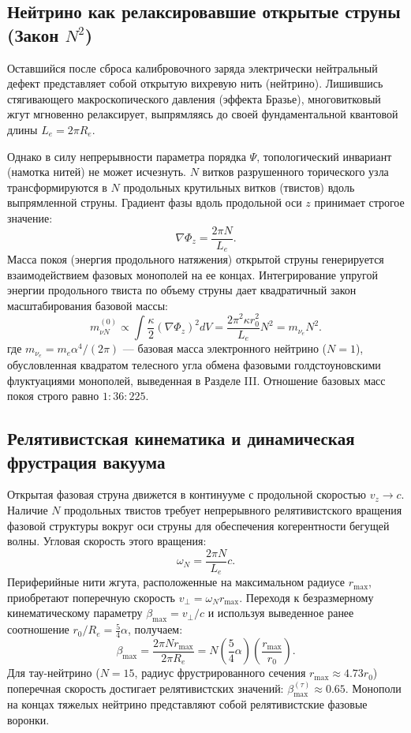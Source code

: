 \documentclass[12pt,a4paper]{article}
\begin{document}
\subsection{Нейтрино как релаксировавшие открытые струны (Закон $N^2$)}
Оставшийся после сброса калибровочного заряда электрически нейтральный дефект представляет собой открытую вихревую нить (нейтрино). Лишившись стягивающего макроскопического давления (эффекта Бразье), многовитковый жгут мгновенно релаксирует, выпрямляясь до своей фундаментальной квантовой длины $L_e = 2\pi R_e$.

Однако в силу непрерывности параметра порядка $\Psi$, топологический инвариант (намотка нитей) не может исчезнуть. $N$ витков разрушенного торического узла трансформируются в $N$ продольных крутильных витков (твистов) вдоль выпрямленной струны. Градиент фазы вдоль продольной оси $z$ принимает строгое значение:
\begin{equation}
	\nabla \Phi_z = \frac{2\pi N}{L_e}.
\end{equation}
Масса покоя (энергия продольного натяжения) открытой струны генерируется взаимодействием фазовых монополей на ее концах. Интегрирование упругой энергии продольного твиста по объему струны дает квадратичный закон масштабирования базовой массы:
\begin{equation}
	m_{\nu N}^{(0)} \propto \int \frac{\kappa}{2} (\nabla \Phi_z)^2 dV = \frac{2\pi^2 \kappa r_0^2}{L_e} N^2 = m_{\nu_e} N^2.
\end{equation}
где $m_{\nu_e} = m_e \alpha^4 / (2\pi)$ — базовая масса электронного нейтрино ($N=1$), обусловленная квадратом телесного угла обмена фазовыми голдстоуновскими флуктуациями монополей, выведенная в Разделе III. Отношение базовых масс покоя строго равно $1 : 36 : 225$.

\subsection{Релятивистская кинематика и динамическая фрустрация вакуума}
Открытая фазовая струна движется в континууме с продольной скоростью $v_z \to c$. Наличие $N$ продольных твистов требует непрерывного релятивистского вращения фазовой структуры вокруг оси струны для обеспечения когерентности бегущей волны. Угловая скорость этого вращения:
\begin{equation}
	\omega_N = \frac{2\pi N}{L_e} c.
\end{equation}
Периферийные нити жгута, расположенные на максимальном радиусе $r_{\text{max}}$, приобретают поперечную скорость $v_\perp = \omega_N r_{\text{max}}$. Переходя к безразмерному кинематическому параметру $\beta_{\text{max}} = v_\perp / c$ и используя выведенное ранее соотношение $r_0/R_e = \frac{5}{4}\alpha$, получаем:
\begin{equation}
	\beta_{\text{max}} = \frac{2\pi N r_{\text{max}}}{2\pi R_e} = N \left( \frac{5}{4}\alpha \right) \left( \frac{r_{\text{max}}}{r_0} \right).
\end{equation}
Для тау-нейтрино ($N=15$, радиус фрустрированного сечения $r_{\text{max}} \approx 4.73 r_0$) поперечная скорость достигает релятивистских значений: $\beta_{\text{max}}^{(\tau)} \approx 0.65$. Монополи на концах тяжелых нейтрино представляют собой релятивистские фазовые воронки.
\end{document}
